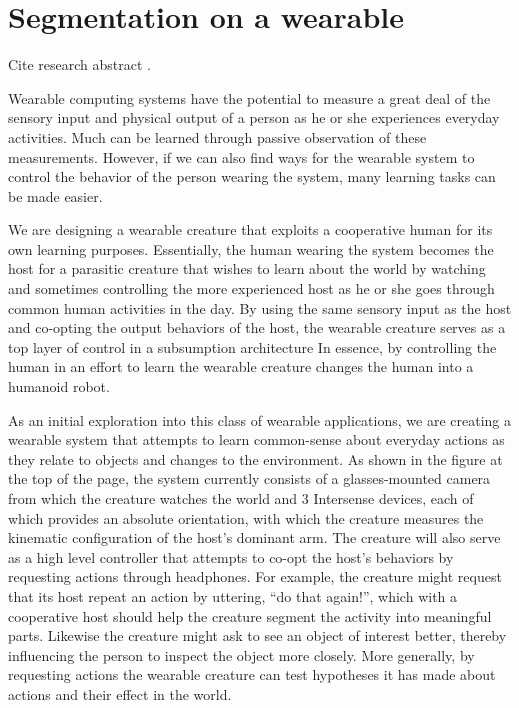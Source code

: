 






\section{Segmentation on a wearable}

Cite research abstract \citep{kemp02humans}.

Wearable computing systems have the potential to measure a great deal
of the sensory input and physical output of a person as he or she
experiences everyday activities. Much can be learned through passive
observation of these measurements. However, if we can also find ways
for the wearable system to control the behavior of the person wearing
the system, many learning tasks can be made easier.

We are designing a wearable creature that exploits a cooperative human
for its own learning purposes. Essentially, the human wearing the
system becomes the host for a parasitic creature that wishes to learn
about the world by watching and sometimes controlling the more
experienced host as he or she goes through common human activities in
the day. By using the same sensory input as the host and co-opting the
output behaviors of the host, the wearable creature serves as a top
layer of control in a subsumption architecture In essence, by
controlling the human in an effort to learn the wearable creature
changes the human into a humanoid robot.

As an initial exploration into this class of wearable applications, we
are creating a wearable system that attempts to learn common-sense
about everyday actions as they relate to objects and changes to the
environment. As shown in the figure at the top of the page, the system
currently consists of a glasses-mounted camera from which the creature
watches the world and 3 Intersense devices, each of which provides an
absolute orientation, with which the creature measures the kinematic
configuration of the host's dominant arm. The creature will also serve
as a high level controller that attempts to co-opt the host's
behaviors by requesting actions through headphones. For example, the
creature might request that its host repeat an action by uttering,
``do that again!'', which with a cooperative host should help the
creature segment the activity into meaningful parts. Likewise the
creature might ask to see an object of interest better, thereby
influencing the person to inspect the object more closely. More
generally, by requesting actions the wearable creature can test
hypotheses it has made about actions and their effect in the world.

